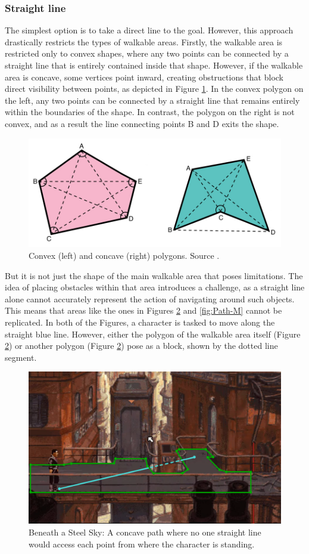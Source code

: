 \subsubsection{Straight line}
The simplest option is to take a direct line to the goal. However, this approach drastically restricts the types of walkable areas. Firstly, the walkable area is restricted only to convex shapes, where any two points can be connected by a straight line that is entirely contained inside that shape. However, if the walkable area is concave, some vertices point inward, creating obstructions that block direct visibility between points, as depicted in Figure \ref{fig:Polygons}. In the convex polygon on the left, any two points can be connected by a straight line that remains entirely within the boundaries of the shape. In contrast, the polygon on the right is not convex, and as a result the line connecting points B and D exits the shape. 

\begin{figure}[H]
\centering
\includegraphics[width=.8\linewidth]{img/polygons.png}
\caption{Convex (left) and concave (right) polygons. Source \cite{Polygons}.}
\label{fig:Polygons}
\end{figure}

But it is not just the shape of the main walkable area that poses limitations. The idea of placing obstacles within that area introduces a challenge, as a straight line alone cannot accurately represent the action of navigating around such objects. This means that areas like the ones in Figures \ref{fig:Path-B}  and \ref{fig:Path-M}  cannot be replicated. In both of the Figures, a character is tasked to move along the straight blue line. However, either the polygon of the walkable area itself (Figure \ref{fig:Path-B}) or another polygon (Figure \ref{fig:Path-B}) pose as a block, shown by the dotted line segment.

\begin{figure}[H]
\centering
\includegraphics[width=.7\linewidth]{img/Path-BaSS2.png}
\caption{Beneath a Steel Sky: A concave path where no one straight line would access each point from where the character is standing.}
\label{fig:Path-B}
\end{figure}

